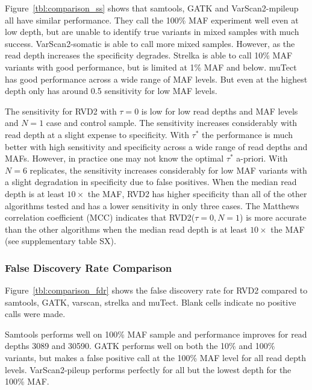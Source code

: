 \documentclass[11pt,reqno]{amsart}
\begin{document}
Figure~\ref{tbl:comparison_ss} shows that samtools, GATK and VarScan2-mpileup all have similar performance. They call the 100\% MAF experiment well even at low depth, but are unable to identify true variants in mixed samples with much success. VarScan2-somatic is able to call more mixed samples. However, as the read depth increases the specificity degrades. Strelka is able to call 10\% MAF variants with good performance, but is limited at 1\% MAF and below. muTect has good performance across a wide range of MAF levels. But even at the highest depth only has around 0.5 sensitivity for low MAF levels.

The sensitivity for RVD2 with $\tau=0$ is low for low read depths and MAF levels and $N=1$ case and control sample. The sensitivity increases considerably with read depth at a slight expense to specificity. With $\tau^*$ the performance is much better with high sensitivity and specificity across a wide range of read depths and MAFs. However, in practice one may not know the optimal $\tau^*$ a-priori. With $N=6$ replicates, the sensitivity increases considerably for low MAF variants with a slight degradation in specificity due to false positives. When the median read depth is at least $10\times$ the MAF, RVD2 has higher specificity than all of the other algorithms tested and has a lower sensitivity in only three cases. The Matthews correlation coefficient (MCC) indicates that RVD2($\tau=0, N=1$) is more accurate than the other algorithms when the median read depth is at least $10\times$ the MAF (see supplementary table SX).

\subsubsection*{False Discovery Rate Comparison}
Figure~\ref{tbl:comparison_fdr} shows the false discovery rate for RVD2 compared to samtools, GATK, varscan, strelka and muTect. Blank cells indicate no positive calls were made.

Samtools performs well on 100\% MAF sample and performance improves for read depths 3089 and 30590. GATK performs well on both the 10\% and 100\% variants, but makes a false positive call at the 100\% MAF level for all read depth levels. VarScan2-pileup performs perfectly for all but the lowest depth for the 100\% MAF.
\end{document}
